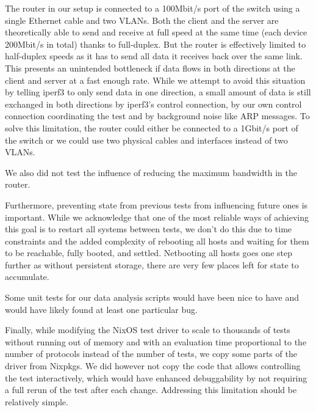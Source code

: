 The router in our setup is connected to a 100Mbit/s port of the switch using a single Ethernet cable and two VLANs.
Both the client and the server are theoretically able to send and receive at full speed at the same time (each device 200Mbit/s in total) thanks to full-duplex.
But the router is effectively limited to half-duplex speeds as it has to send all data it receives back over the same link.
This presents an unintended bottleneck if data flows in both directions at the client and server at a fast enough rate.
While we attempt to avoid this situation by telling iperf3 to only send data in one direction, a small amount of data is still exchanged in both directions by iperf3's control connection, by our own control connection coordinating the test and by background noise like ARP messages.
To solve this limitation, the router could either be connected to a 1Gbit/s port of the switch or we could use two physical cables and interfaces instead of two VLANs.

We also did not test the influence of reducing the maximum bandwidth in the router.

Furthermore, preventing state from previous tests from influencing future ones is important.
While we acknowledge that one of the most reliable ways of achieving this goal is to restart all systems between tests, we don't do this due to time constraints and the added complexity of rebooting all hosts and waiting for them to be reachable, fully booted, and settled.
Netbooting all hosts goes one step further as without persistent storage, there are very few places left for state to accumulate.

Some unit tests for our data analysis scripts would have been nice to have and would have likely found at least one particular bug.

Finally, while modifying the NixOS test driver to scale to thousands of tests without running out of memory and with an evaluation time proportional to the number of protocols instead of the number of tests, we copy some parts of the driver from Nixpkgs.
We did however not copy the code that allows controlling the test interactively, which would have enhanced debuggability by not requiring a full rerun of the test after each change.
Addressing this limitation should be relatively simple.


